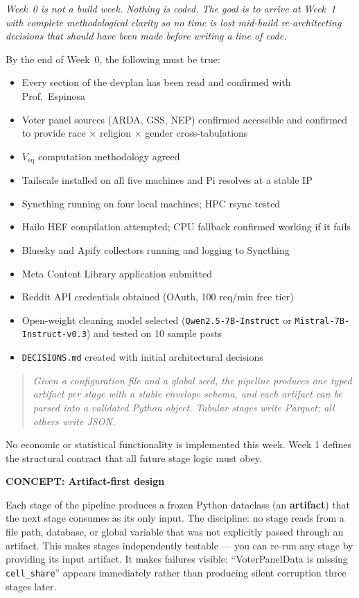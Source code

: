 \documentclass[11pt]{article}
\newcommand{\concept}[2]{%
  \begin{mdframed}[style=conceptbox]
  {\small\bfseries\color{bluefg}CONCEPT: #1}\par\smallskip #2
  \end{mdframed}}
\begin{document}
\textit{Week~0 is not a build week. Nothing is coded. The goal is to arrive at Week~1
with complete methodological clarity so no time is lost mid-build re-architecting decisions
that should have been made before writing a line of code.}

By the end of Week~0, the following must be true:
\begin{itemize}[leftmargin=1.6em, itemsep=2pt]
  \item Every section of the devplan has been read and confirmed with Prof.\ Espinosa
  \item Voter panel sources (ARDA, GSS, NEP) confirmed accessible and confirmed to
        provide race $\times$ religion $\times$ gender cross-tabulations
  \item $V_{\text{eq}}$ computation methodology agreed
  \item Tailscale installed on all five machines and Pi resolves at a stable IP
  \item Syncthing running on four local machines; HPC rsync tested
  \item Hailo HEF compilation attempted; CPU fallback confirmed working if it fails
  \item Bluesky and Apify collectors running and logging to Syncthing
  \item Meta Content Library application submitted
  \item Reddit API credentials obtained (OAuth, 100 req/min free tier)
  \item Open-weight cleaning model selected (\texttt{Qwen2.5-7B-Instruct} or
        \texttt{Mistral-7B-Instruct-v0.3}) and tested on 10 sample posts
  \item \texttt{DECISIONS.md} created with initial architectural decisions
\end{itemize}

\begin{quote}
\textit{Given a configuration file and a global seed, the pipeline produces one typed
artifact per stage with a stable envelope schema, and each artifact can be parsed into
a validated Python object. Tabular stages write Parquet; all others write JSON.}
\end{quote}

No economic or statistical functionality is implemented this week. Week 1 defines the structural
contract that all future stage logic must obey.

\concept{Artifact-first design}{
Each stage of the pipeline produces a frozen Python dataclass (an \textbf{artifact})
that the next stage consumes as its only input. The discipline: no stage reads from
a file path, database, or global variable that was not explicitly passed through an
artifact. This makes stages independently testable --- you can re-run any stage by
providing its input artifact. It makes failures visible: ``VoterPanelData is missing
\texttt{cell\_share}'' appears immediately rather than producing silent corruption
three stages later.
}
\end{document}
